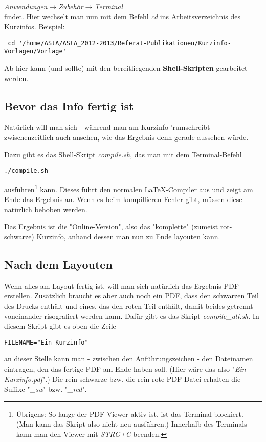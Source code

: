\documentclass[a4paper,10pt]{article}
\begin{document}
\textit{Anwendungen}$\rightarrow$\textit{Zubehör}$\rightarrow$\textit{Terminal}\\

findet. Hier wechselt man nun mit dem Befehl \textit{cd} ins Arbeitsverzeichnis des Kurzinfos. Beispiel:
\begin{verbatim}
 cd '/home/AStA/AStA_2012-2013/Referat-Publikationen/Kurzinfo-Vorlagen/Vorlage'
\end{verbatim}

{\large Ab hier kann (und sollte) mit den bereitliegenden \textbf{Shell-Skripten} gearbeitet werden.}

\subsection*{Bevor das Info fertig ist}
Natürlich will man sich - während man am Kurzinfo 'rumschreibt - zwischenzeitlich auch ansehen, wie das Ergebnis denn gerade aussehen würde.

Dazu gibt es das Shell-Skript \textit{compile.sh}, das man mit dem Terminal-Befehl
\begin{verbatim}
./compile.sh
\end{verbatim}
ausführen\footnote{Übrigens: So lange der PDF-Viewer aktiv ist, ist das Terminal blockiert. (Man kann das Skript also nicht neu ausführen.) Innerhalb des Terminals kann man den Viewer mit \textit{STRG+C} beenden.} kann. Dieses führt den normalen \LaTeX{}-Compiler aus und zeigt am Ende das Ergebnis an. Wenn es beim kompillieren Fehler gibt, müssen diese natürlich behoben werden.

Das Ergebnis ist die "Online-Version", also das "komplette" (zumeist rot-schwarze) Kurzinfo, anhand dessen man nun zu Ende layouten kann.

\subsection*{Nach dem Layouten}
Wenn alles am Layout fertig ist, will man sich natürlich das Ergebnis-PDF erstellen. Zusätzlich braucht es aber auch noch ein PDF, dass den schwarzen Teil des Drucks enthält und eines, das den roten Teil enthält, damit beides getrennt voneinander risografiert werden kann. Dafür gibt es das Skript \textit{compile\_all.sh}. In diesem Skript gibt es oben die Zeile
\begin{verbatim}
FILENAME="Ein-Kurzinfo"
\end{verbatim}
an dieser Stelle kann man - zwischen den Anführungszeichen - den Dateinamen eintragen, den das fertige PDF am Ende haben soll. (Hier wäre das also "\textit{Ein-Kurzinfo.pdf}".)
Die rein schwarze bzw. die rein rote PDF-Datei erhalten die Suffixe "\textit{\_sw}" bzw. "\textit{\_red}".
\end{document}
